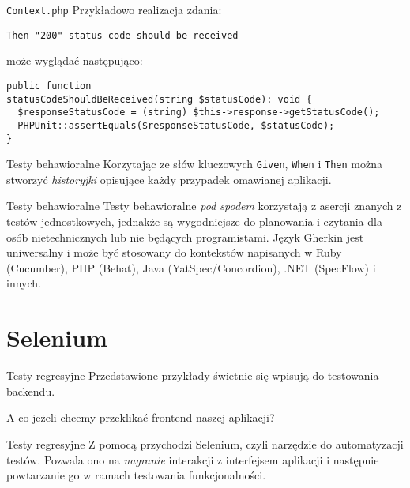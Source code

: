 \begin{frame}[fragile]{\texttt{Context.php}}	
	Przykładowo realizacja zdania:
	
\begin{lstlisting}
Then "200" status code should be received
\end{lstlisting}

	może wyglądać następująco:
	
\begin{lstlisting}
public function
statusCodeShouldBeReceived(string $statusCode): void {
  $responseStatusCode = (string) $this->response->getStatusCode();
  PHPUnit::assertEquals($responseStatusCode, $statusCode);
}
\end{lstlisting}
\end{frame}

\begin{frame}{Testy behawioralne}
	Korzytając ze słów kluczowych \texttt{Given}, \texttt{When} i \texttt{Then} można stworzyć \emph{historyjki} opisujące każdy przypadek omawianej aplikacji.
\end{frame}

\begin{frame}{Testy behawioralne}
	Testy behawioralne \emph{pod spodem} korzystają z asercji znanych z testów jednostkowych, jednakże są wygodniejsze do planowania i czytania dla osób nietechnicznych lub nie będących programistami. Język Gherkin jest uniwersalny i może być stosowany do kontekstów napisanych w Ruby (Cucumber), PHP (Behat), Java (YatSpec/Concordion), .NET (SpecFlow) i innych.
\end{frame}

\section{Selenium}

\begin{frame}{Testy regresyjne}
	Przedstawione przykłady świetnie się wpisują do testowania backendu.
	
	A co jeżeli chcemy przeklikać frontend naszej aplikacji?
\end{frame}

\begin{frame}{Testy regresyjne}
	Z pomocą przychodzi Selenium, czyli narzędzie do automatyzacji testów. Pozwala ono na \emph{nagranie} interakcji z interfejsem aplikacji i następnie powtarzanie go w ramach testowania funkcjonalności.
\end{frame}

